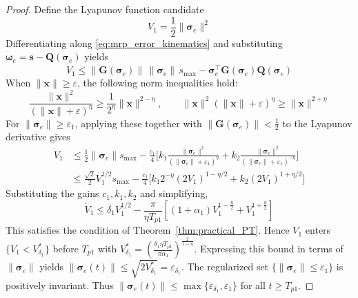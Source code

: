 \documentclass[journal]{new-aiaa}
\begin{document}
\begin{proof}
Define the Lyapunov function candidate
\begin{equation}
V_1 = \frac{1}{2}\|\boldsymbol{\sigma}_e\|^2
\end{equation}
Differentiating along \eqref{eq:mrp_error_kinematics} and 
substituting $\boldsymbol{\omega}_e = \boldsymbol{s} - \boldsymbol{Q}(\boldsymbol{\sigma}_e)$ yields
\begin{equation}
\dot{V}_1 \le \|\boldsymbol{G}(\boldsymbol{\sigma}_e)\|\,\|\boldsymbol{\sigma}_e\|\,s_{\max}
- \boldsymbol{\sigma}_e^\top \boldsymbol{G}(\boldsymbol{\sigma}_e) \boldsymbol{Q}(\boldsymbol{\sigma}_e)
\end{equation}
When $\|\boldsymbol{x}\|\ge\varepsilon$, the following norm inequalities hold:
\begin{equation}
\frac{\|\boldsymbol{x}\|^2}{(\|\boldsymbol{x}\|+\varepsilon)^\eta} \ge \frac{1}{2^\eta} \|\boldsymbol{x}\|^{2-\eta},
\qquad
\|\boldsymbol{x}\|^2(\|\boldsymbol{x}\|+\varepsilon)^\eta \ge \|\boldsymbol{x}\|^{2+\eta}
\label{eq:norm_inequalities}
\end{equation}
For $\|\boldsymbol{\sigma}_e\| \ge \varepsilon_1$, applying these
together with $\|\boldsymbol{G}(\boldsymbol{\sigma}_e)\| < \tfrac{1}{2}$
to the Lyapunov derivative gives
\begin{align}
\dot{V}_1
&\le \frac{1}{2}\|\boldsymbol{\sigma}_e\| s_{\max}
- \frac{c_1}{4}\Big[k_1\frac{\|\boldsymbol{\sigma}_e\|^2}{(\|\boldsymbol{\sigma}_e\|+\varepsilon_1)^\eta}
+ k_2\frac{\|\boldsymbol{\sigma}_e\|^2}{(\|\boldsymbol{\sigma}_e\|+\varepsilon_1)^{-\eta}}\Big] \nonumber \\
&\le \frac{\sqrt{2}}{2} V_1^{1/2} s_{\max}
- \frac{c_1}{4}\big[k_1 2^{-\eta} (2V_1)^{1-\eta/2} + k_2 (2V_1)^{1+\eta/2}\big]
\end{align}
Substituting the gains $c_1,k_1,k_2$ and simplifying,
\begin{equation}
\dot{V}_1 \le \delta_1 V_1^{1/2}
- \frac{\pi}{\eta T_{p1}}\left[(1+\alpha_1)V_1^{1-\frac{\eta}{2}} + V_1^{1+\frac{\eta}{2}}\right]
\label{eq:V1dot_final}
\end{equation}
This satisfies the condition of Theorem~\ref{thm:practical_PT}. Hence $V_1$ enters $\{V_1 < V^*_{\delta_1}\}$ before $T_{p1}$ with
$V^*_{\delta_1} = (\frac{\delta_1 \eta T_{p1}}{\pi \alpha_1})^{\frac{2}{1-\eta}}$.
Expressing this bound in terms of $\|\boldsymbol{\sigma}_e\|$ yields $\|\boldsymbol{\sigma}_e(t)\| \le \sqrt{2V^*_{\delta_1}} = \varepsilon_{\delta_1}$.
The regularized set $\{\|\boldsymbol{\sigma}_e\|\le\varepsilon_1\}$ is positively invariant.
Thus $\|\boldsymbol{\sigma}_e(t)\| \le \max\{\varepsilon_{\delta_1},\varepsilon_1\}$ for all $t\ge T_{p1}$.
\end{proof}
\end{document}
